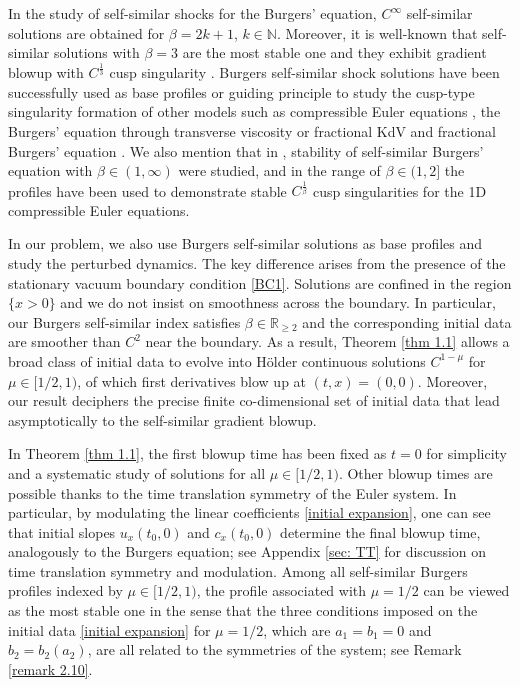 \documentclass{article}
\numberwithin{equation}{section}
\begin{document}
In the study of self-similar shocks for the Burgers' equation, $C^\infty$ self-similar solutions are obtained for $\beta = 2k+1$, $k\in \mathbb N$. Moreover, it is well-known that self-similar solutions with $\beta = 3$ are the most stable one and they exhibit gradient blowup with $C^\frac13$ cusp singularity \cite{CGN18, EF00}.  Burgers self-similar shock solutions have been successfully used as base profiles or guiding principle to study the cusp-type singularity formation of other models such as  compressible Euler equations \cite{BuckmasterIyer,Buckmaster22,NealShkollerVicol25}, the Burgers' equation through transverse viscosity \cite{CGN18} or fractional KdV and fractional Burgers' equation  \cite{OhPasqualotto24}. We also mention that in \cite{NRSV24},  
stability of self-similar Burgers' equation with $\beta\in(1,\infty)$ were studied, 
and in the range of $\beta\in (1,2]$ the profiles  have been used to demonstrate stable $C^{\frac{1}{\beta}}$ cusp singularities for the 1D compressible Euler equations. 


In our problem, we also use Burgers self-similar solutions as base profiles and study the perturbed dynamics. The key difference arises from the presence of the stationary vacuum boundary condition \eqref{BC1}. Solutions are confined in the region $\{x>0\}$ and we do not insist on smoothness across the boundary. In particular, our Burgers self-similar index satisfies $\beta\in \mathbb R_{\ge 2}$
and the corresponding initial data are smoother than $C^2$ near the boundary. As a result, Theorem \ref{thm 1.1} allows a broad class of initial data to evolve into H\"{o}lder continuous solutions $C^{1-\mu}$ for $\mu \in [1/2,1)$, of which first derivatives blow up at $(t,x)=(0,0)$. Moreover, our result deciphers the precise finite co-dimensional set of initial data that lead asymptotically to the self-similar gradient blowup.   


In  Theorem \ref{thm 1.1}, the first blowup time  has been fixed as $t=0$ for simplicity and a systematic study of solutions for all $\mu \in [1/2,1)$. Other blowup times are possible thanks to the time translation symmetry of the Euler system. In particular, by modulating the linear coefficients \eqref{initial expansion}, one can see that initial slopes $u_x(t_0,0)$ and $c_x(t_0,0)$ determine the final blowup time, analogously to the Burgers equation; see Appendix \ref{sec: TT} for discussion on time translation symmetry and modulation. Among all self-similar Burgers profiles indexed by $\mu \in [1/2,1)$, the profile associated with $\mu=1/2$ can be viewed as the most stable one in the sense that the three conditions imposed on the initial data \eqref{initial expansion} for $\mu=1/2$, which are $a_1=b_1=0$ and $b_2=b_2(a_2)$,  are all related to the symmetries of the  system; see Remark \ref{remark 2.10}. 
\end{document}
